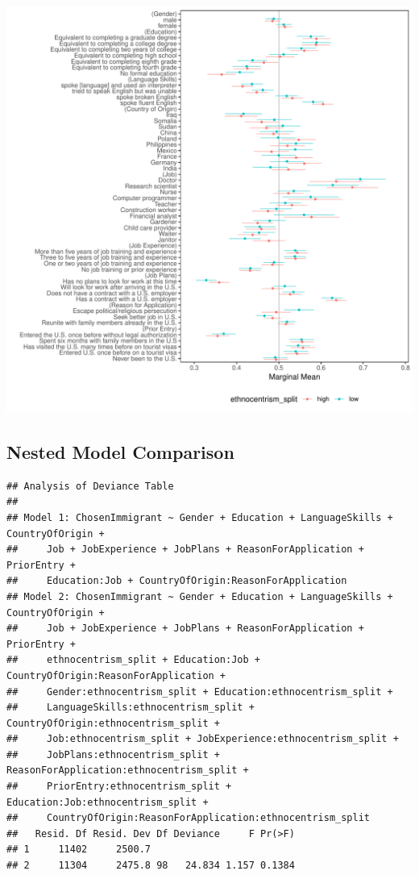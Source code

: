 \documentclass[a4paper,12pt]{article}\usepackage[]{graphicx}\usepackage[]{color}
\makeatletter
\def\maxwidth{ %
  \ifdim\Gin@nat@width>\linewidth
    \linewidth
  \else
    \Gin@nat@width
  \fi
}
\newenvironment{kframe}{%
 \def\at@end@of@kframe{}%
 \ifinner\ifhmode%
  \def\at@end@of@kframe{\end{minipage}}%
  \begin{minipage}{\columnwidth}%
 \fi\fi%
 \def\FrameCommand##1{\hskip\@totalleftmargin \hskip-\fboxsep
 \colorbox{shadecolor}{##1}\hskip-\fboxsep
     \hskip-\linewidth \hskip-\@totalleftmargin \hskip\columnwidth}%
 \MakeFramed {\advance\hsize-\width
   \@totalleftmargin\z@ \linewidth\hsize
   \@setminipage}}%
 {\par\unskip\endMakeFramed%
 \at@end@of@kframe}
\newenvironment{knitrout}{}{} %
\makeatother
\begin{document}
\begin{knitrout}
\color{fgcolor}
\includegraphics[width=\maxwidth]{figure/hainmueller_immigration_subgroup_mm_appendix-1} 

\end{knitrout}

\clearpage

\subsection{Nested Model Comparison}

\begin{knitrout}
\color{fgcolor}\begin{kframe}
\begin{verbatim}
## Analysis of Deviance Table
## 
## Model 1: ChosenImmigrant ~ Gender + Education + LanguageSkills + CountryOfOrigin + 
##     Job + JobExperience + JobPlans + ReasonForApplication + PriorEntry + 
##     Education:Job + CountryOfOrigin:ReasonForApplication
## Model 2: ChosenImmigrant ~ Gender + Education + LanguageSkills + CountryOfOrigin + 
##     Job + JobExperience + JobPlans + ReasonForApplication + PriorEntry + 
##     ethnocentrism_split + Education:Job + CountryOfOrigin:ReasonForApplication + 
##     Gender:ethnocentrism_split + Education:ethnocentrism_split + 
##     LanguageSkills:ethnocentrism_split + CountryOfOrigin:ethnocentrism_split + 
##     Job:ethnocentrism_split + JobExperience:ethnocentrism_split + 
##     JobPlans:ethnocentrism_split + ReasonForApplication:ethnocentrism_split + 
##     PriorEntry:ethnocentrism_split + Education:Job:ethnocentrism_split + 
##     CountryOfOrigin:ReasonForApplication:ethnocentrism_split
##   Resid. Df Resid. Dev Df Deviance     F Pr(>F)
## 1     11402     2500.7                         
## 2     11304     2475.8 98   24.834 1.157 0.1384
\end{verbatim}
\end{kframe}
\end{knitrout}
\end{document}
